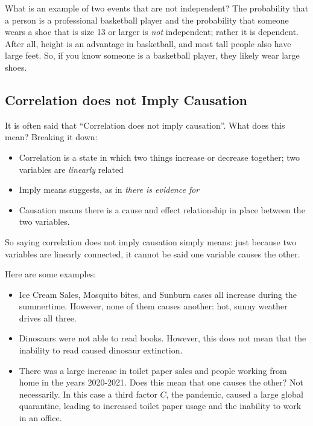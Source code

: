 What is an example of two events that are not independent? The probability that a
person is a professional basketball player and the probability that
someone wears a shoe that is size 13 or larger is \textit{not}
independent; rather it is dependent. After all, height is an advantage in basketball, and most
tall people also have large feet. So, if you know someone is a
basketball player, they likely wear large shoes.

\subsection{Correlation does not Imply Causation}
It is often said that ``Correlation does not imply causation''. What does this mean? 
Breaking it down:
\begin{itemize}
  \item Correlation is a state in which two things increase or decrease together; two variables are \emph{linearly} related
  \item Imply means suggests, as in \textit{there is evidence for}
  \item Causation means there is a cause and effect relationship in place between the two variables. 
\end{itemize}

So saying correlation does not imply causation simply means: just because two variables are linearly connected, it cannot be said one variable causes the other. 

Here are some examples:
\begin{itemize}
  \item Ice Cream Sales, Mosquito bites, and Sunburn cases all increase during the summertime. However, none of them causes another: hot, sunny weather drives all three.
  \item Dinosaurs were not able to read books. However, this does not mean that the inability to read caused dinosaur extinction. 
  \item There was a large increase in toilet paper sales and people working from home in the years 2020-2021. Does this mean that one causes the other? Not necessarily. In this case a third factor $C$, the pandemic, caused a large global quarantine, leading to increased toilet paper usage and the inability to work in an office. 
\end{itemize}


